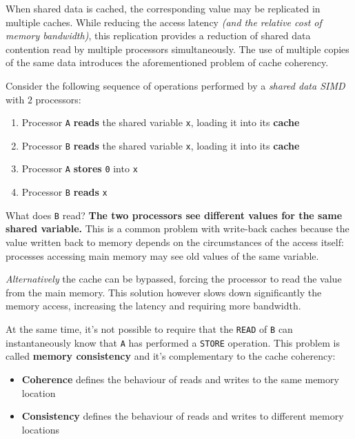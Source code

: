 \documentclass[english]{article}
\begin{document}
When shared data is cached, the corresponding value may be replicated in multiple caches.
While reducing the access latency \textit{(and the relative cost of memory bandwidth)}, this replication provides a reduction of shared data contention read by multiple processors simultaneously.
The use of multiple copies of the same data introduces the aforementioned problem of cache coherency.

Consider the following sequence of operations performed by a \textit{shared data SIMD} with \(2\) processors:

\begin{enumerate}
  \item Processor \texttt{A} \textbf{reads} the shared variable \texttt{x}, loading it into its \textbf{cache}
  \item Processor \texttt{B} \textbf{reads} the shared variable \texttt{x}, loading it into its \textbf{cache}
  \item Processor \texttt{A} \textbf{stores} \texttt{0} into \texttt{x}
  \item Processor \texttt{B} \textbf{reads} \texttt{x}
\end{enumerate}

What does \texttt{B} read?
\textbf{The two processors see different values for the same shared variable.}
This is a common problem with write-back caches because the value written back to memory depends on the circumstances of the access itself: processes accessing main memory may see old values of the same variable.

\textit{Alternatively} the cache can be bypassed, forcing the processor to read the value from the main memory.
This solution however slows down significantly the memory access, increasing the latency and requiring more bandwidth.

At the same time, it's not possible to require that the \texttt{READ} of \texttt{B} can instantaneously know that \texttt{A} has performed a \texttt{STORE} operation.
This problem is called \textbf{memory consistency} and it's complementary to the cache coherency:

\begin{itemize}
  \item \textbf{Coherence} defines the behaviour of reads and writes to the same memory location
  \item \textbf{Consistency} defines the behaviour of reads and writes to different memory locations
\end{itemize}
\end{document}
